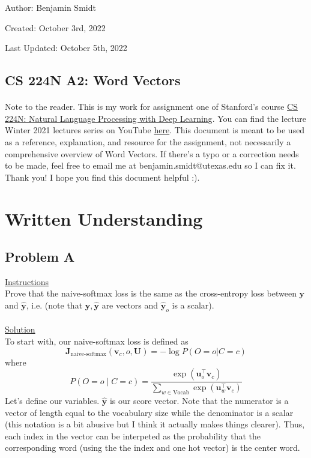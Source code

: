\documentclass[12pt]{article}
\begin{document}
\noindent Author: Benjamin Smidt

\noindent Created: October 3rd, 2022

\noindent Last Updated: October 5th, 2022
\begin{center}
\section*{CS 224N A2: Word Vectors}
\end{center}

\paragraph{} Note to the reader. This is my work for assignment one of Stanford's course
\href{https://web.stanford.edu/class/cs224n/}{CS 224N: Natural Language Processing with Deep Learning}. 
You can find the lecture Winter 2021 lectures series on YouTube \href{https://www.youtube.com/playlist?list=PLoROMvodv4rOSH4v6133s9LFPRHjEmbmJ}{here}.
This document is meant to be used as a reference, explanation, and resource for the assignment, 
not necessarily a comprehensive overview of Word Vectors. If there's a typo or a correction 
needs to be made, feel free to email me at benjamin.smidt@utexas.edu so I can fix it. 
Thank you! I hope you find this document helpful :). 

\tableofcontents{}

\newpage

\section{Written Understanding}

\subsection{Problem A}
\underline{Instructions}
~\\
Prove that the naive-softmax loss is the same as the cross-entropy 
loss between $\bm y$ and $\hat{\bm y}$, i.e. (note that $\bm y, \hat{\bm y}$ 
are vectors and $\hat{\bm y}_o$ is a scalar).
~\\
~\\
\underline{Solution}
~\\
To start with, our naive-softmax loss is defined as
\begin{equation*}
    \bm J_{\text{naive-softmax}}(\bm v_c, o, \bm U) = -\log P(O=o| C=c)
\end{equation*}
where 
\begin{equation*}
P(O=o \mid C=c) = \frac{\exp(\bm u_{o}^\top \bm v_c)}{\sum_{w \in \text{Vocab}} \exp(\bm u_{w}^\top \bm v_c)}
\end{equation*}
Let's define our variables. $ \hat{\bm y}$ is our score vector. Note that the 
numerator is a vector of length equal to the vocabulary size while the denominator is a scalar (this notation 
is a bit abusive but I think it actually makes things clearer). Thus, each index 
in the vector can be interpeted as the probability that the corresponding word (using the 
the index and one hot vector) is the center word. 
\end{document}
